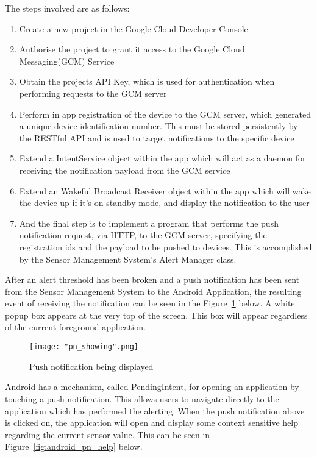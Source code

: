 \documentclass{article}
\begin{document}
The steps involved are as follows:  
\begin{enumerate}
  \item Create a new project in the Google Cloud Developer Console
  \item Authorise the project to grant it access to the Google Cloud Messaging(GCM) Service
  \item Obtain the projects API Key, which is used for authentication when performing requests to the GCM server
  \item Perform in app registration of the device to the GCM server, which generated a unique device identification number. This must be stored persistently by the RESTful API and is used to target notifications to the specific device
  \item Extend a IntentService object within the app which will act as a daemon for receiving the notification payload from the GCM service
  \item Extend an Wakeful Broadcast Receiver object within the app which will wake the device up if it’s on standby mode, and display the notification to the user
  \item And the final step is to implement a program that performs the push notification request, via HTTP, to the GCM server, specifying the registration ids and the payload to be pushed to devices. This is accomplished by the Sensor Management System\rq s Alert Manager class. 
\end{enumerate}	

\noindent
After an alert threshold has been broken and a push notification has been sent from the Sensor Management System to the Android Application, the resulting event of receiving the notification can be seen in the Figure~\ref{fig:android_pn_displayed} below. A white popup box appears at the very top of the screen. This box will appear regardless of the current foreground application. 

\begin{figure}[H]
\centering
\texttt{[image: "pn\_showing".png]}
\caption{Push notification being displayed}
\label{fig:android_pn_displayed}
\end{figure}

\noindent
Android has a mechanism, called PendingIntent, for opening an application by touching a push notification. This allows users to navigate directly to the application which has performed the alerting. When the push notification above is clicked on, the application will open and display some context sensitive help regarding the current sensor value. This can be seen in Figure~\ref{fig:android_pn_help} below.
\end{document}
